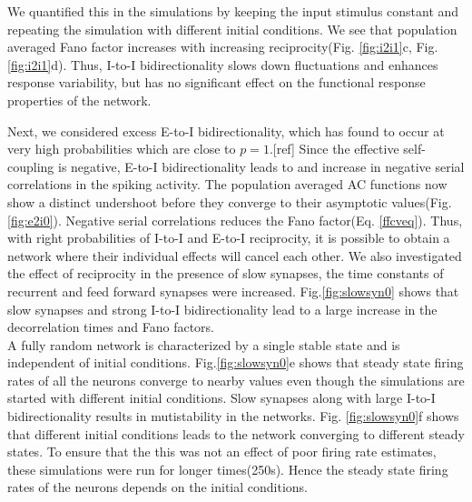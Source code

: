 We quantified this in the simulations by keeping the input stimulus constant and repeating the simulation with different initial conditions. We see that population averaged Fano factor increases with increasing reciprocity(Fig. \ref{fig:i2i1}c, Fig. \ref{fig:i2i1}d). Thus, I-to-I bidirectionality slows down fluctuations and enhances response variability, but has no significant effect on the functional response properties of the network. 



Next, we considered excess E-to-I bidirectionality, which has found to occur at very high probabilities which are close to $p=1$.[ref] %
Since the effective self-coupling is negative, E-to-I bidirectionality leads to and increase in negative serial correlations in the spiking activity. The population averaged AC functions now show a distinct undershoot before they converge to their asymptotic values(Fig. \ref{fig:e2i0}). Negative serial correlations reduces the Fano factor(Eq. \ref{ffcveq}). Thus,  with right probabilities of I-to-I and E-to-I reciprocity, it is possible to obtain a network where their individual effects will cancel each other.  
We also investigated the effect of reciprocity in the presence of slow synapses, the time constants of recurrent and feed forward synapses were increased. Fig.\ref{fig:slowsyn0} shows that slow synapses and strong I-to-I bidirectionality lead to a large increase in the decorrelation times and Fano factors.\\  A fully random network is characterized by a single stable state and is independent of initial conditions. Fig.\ref{fig:slowsyn0}e shows that steady state firing rates of all the neurons converge to nearby values even though the simulations are started with different initial conditions. Slow synapses along with large I-to-I bidirectionality results in mutistability in the networks. Fig. \ref{fig:slowsyn0}f shows that different initial conditions leads to the network converging to different steady states. To ensure that the this was not an effect of poor firing rate estimates, these simulations were run for longer times(250s). Hence the steady state firing rates of the neurons depends on the initial conditions.\\
